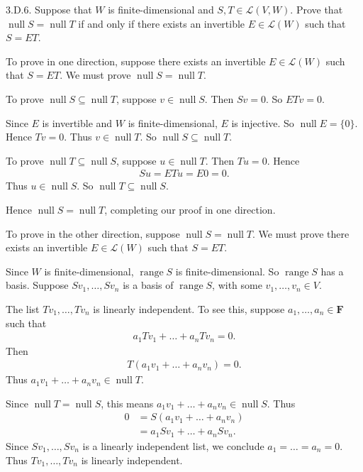 \documentclass[a5paper]{article}
\begin{document}
\newcommand   \C           {\mathbf{C}}
\newcommand   \R           {\mathbf{R}}
\renewcommand \L           {\mathcal{L}}
\newcommand   \F           {\mathbf{F}}
\renewcommand \P           {\mathcal{P}}
\newcommand   \M           {\mathcal{M}}
\newcommand   \op          {\operatorname}

    3.D.6.
    Suppose that $W$ is finite-dimensional and $S,T \in \L(V,W)$.
    Prove that $\op{null}S = \op{null}T$ if and only if there exists an invertible $E \in \L(W)$ such that $S = ET$.

    To prove in one direction, suppose there exists an invertible $E \in \L(W)$ such that $S = ET$.
    We must prove $\op{null}S = \op{null}T$.

    To prove $\op{null}S \subseteq \op{null}T$, suppose $v \in \op{null}S$.
    Then $Sv = 0$.
    So $ETv = 0$.

    Since $E$ is invertible and $W$ is finite-dimensional, $E$ is injective.
    So $\op{null}E = \{0\}$.
    Hence $Tv = 0$.
    Thus $v \in \op{null}T$.
    So $\op{null}S \subseteq \op{null}T$.

    To prove $\op{null}T \subseteq \op{null}S$, suppose $u \in \op{null}T$.
    Then $Tu = 0$.
    Hence
\begin{align*}
        Su = ETu = E0 = 0 .
\end{align*}
    Thus $u \in \op{null}S$.
    So $\op{null}T \subseteq \op{null}S$.

    Hence $\op{null}S = \op{null}T$, completing our proof in one direction.

    To prove in the other direction, suppose $\op{null}S = \op{null}T$.
    We must prove there exists an invertible $E \in \L(W)$ such that $S = ET$.

    Since $W$ is finite-dimensional, $\op{range}S$ is finite-dimensional.
    So $\op{range}S$ has a basis.
    Suppose $Sv_1,\dots,Sv_n$ is a basis of $\op{range}S$, with some $v_1,\dots,v_n \in V$.

    The list $Tv_1,\dots,Tv_n$ is linearly independent.
    To see this, suppose $a_1,\dots,a_n \in \F$ such that
\begin{align*}
        a_1 Tv_1 + \dots + a_n T v_n = 0 .
\end{align*}
    Then
\begin{align*}
        T(a_1 v_1 + \dots + a_n v_n) = 0 .
\end{align*}
    Thus $a_1v_1+\dots+a_nv_n \in \op{null}T$.

    Since $\op{null}T = \op{null}S$, this means $a_1v_1+\dots+a_nv_n \in \op{null}S$.
    Thus
\begin{align*}
        0 &= S(a_1 v_1 + \dots + a_n v_n) \\
          &= a_1 Sv_1 + \dots + a_n Sv_n .
\end{align*}
    Since $Sv_1,\dots,Sv_n$ is a linearly independent list, we conclude $a_1=\dots=a_n=0$.
    Thus $Tv_1,\dots,Tv_n$ is linearly independent.
\end{document}
